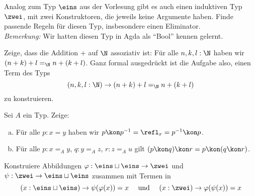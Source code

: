 \documentclass{hott-übung}
\begin{document}
\setcounter{blattnummer}{2}
\setcounter{aufgabennummer}{0}

\blatt

\aufgabe{}
Analog zum Typ $\eins$ aus der Vorlesung gibt es auch einen induktiven Typ $\zwei$,
mit zwei Konstruktoren, die jeweils keine Argumente haben.
Finde passende Regeln für diesen Typ, insbesondere einen Eliminator.\\
\emph{Bemerkung:} Wir hatten diesen Typ in Agda als ``Bool'' kennen gelernt. 

\aufgabe{}
Zeige, dass die Addition $+$ auf $\N$ assoziativ ist:
Für alle $n,k,l:\N$ haben wir $(n+k)+l=_\N n+(k+l)$.
Ganz formal ausgedrückt ist die Aufgabe also, einen Term des Typs
\[
  (n,k,l:\N) \to (n+k)+l=_\N n+(k+l)
\]
zu konstruieren.

\aufgabe{}
Sei $A$ ein Typ. Zeige:
\begin{enumerate}[(a)]
\item Für alle $ p:x=y$ haben wir $ p\kon p^{-1}=\refl_x= p^{-1}\kon p$.
\item Für alle $ p:x=_Ay$, $ q:y=_Az$, $ r:z=_Au$ gilt
   $( p\kon q)\kon r= p\kon( q\kon r)$.
\end{enumerate}

\aufgabe{}
Konstruiere Abbildungen $\varphi:\eins\sqcup \eins\to \zwei$ und $\psi:\zwei\to \eins\sqcup \eins$
zusammen mit Termen in
\[
  (x:\eins\sqcup \eins)\to \psi (\varphi(x))=x\quad \text{ und }\quad (x:\zwei)\to \varphi(\psi(x))=x
\]
\end{document}
